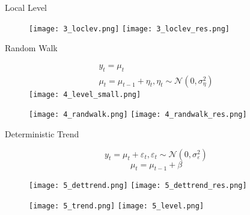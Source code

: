 \documentclass{beamer}
\begin{document}
\begin{frame}[fragile]
\begin{columns}[T]
\begin{column}{.32\textwidth}
\begin{block}{Local Level}
\begin{figure}[htb]
  \texttt{[image: 3\_loclev.png]}
\endminipage\hfill
{}
  \texttt{[image: 3\_loclev\_res.png]}
\endminipage\hfill
\end{figure}
\end{block}

\begin{block}{Random Walk}

\vspace{-0.25cm}

\begin{figure}[htb]
\begin{gather*}
y_t = \mu_t
\\
\mu_t = \mu_{t-1} + \eta_t , \eta_t \sim \mathcal{N}(0, \sigma_\eta^2)
\end{gather*}
\endminipage \hfill
{}
\texttt{[image: 4\_level\_small.png]}
\endminipage\hfill
\end{figure}

\begin{figure}[htb]
  \texttt{[image: 4\_randwalk.png]}
\endminipage\hfill
{}
  \texttt{[image: 4\_randwalk\_res.png]}
\endminipage\hfill
\end{figure}
\end{block}

\begin{block}{Deterministic Trend}

\vspace{-0.5cm}

\[
y_t = \mu_t + \varepsilon_t, \varepsilon_t \sim \mathcal{N}(0, \sigma^2_\varepsilon)
\]
\[
\mu_t = \mu_{t-1} + \beta
\]

\begin{figure}[htb]
  \texttt{[image: 5\_dettrend.png]}
\endminipage\hfill
{}
  \texttt{[image: 5\_dettrend\_res.png]}
\endminipage\hfill
\end{figure}

\vspace{-0.25cm}

\begin{figure}[htb]
  \texttt{[image: 5\_trend.png]}
\endminipage\hfill
{}
  \texttt{[image: 5\_level.png]}
\endminipage\hfill
\end{figure}
\end{block}


\end{column}
\end{columns}
\end{frame}
\end{document}
